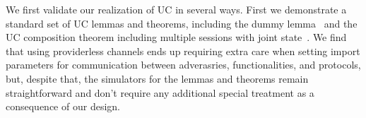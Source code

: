 
We first validate our realization of UC in several ways. First we demonstrate a standard set of UC lemmas and theorems, including the dummy lemma~\cite{ilc,gnuc,easyuc,canettiUC} and the UC composition theorem including multiple sessions with joint state~\cite{symbolicuc}. 
We find that using providerless channels ends up requiring extra care when setting import parameters for communication between adverasries, functionalities, and protocols, but, despite that, the simulators for the lemmas and theorems remain straightforward and don't require any additional special treatment as a consequence of our design. 


